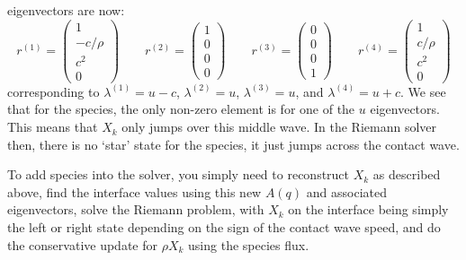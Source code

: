 eigenvectors are now:
\begin{equation}
r^{(1)} = \left ( \begin{array}{c} 1 \\ -c/\rho \\ c^2 \\ 0\end{array} \right )
%
\qquad
r^{(2)} = \left ( \begin{array}{c} 1 \\ 0 \\ 0  \\ 0\end{array} \right )
%
\qquad
r^{(3)} = \left ( \begin{array}{c} 0 \\ 0  \\ 0 \\ 1 \end{array} \right )
%
\qquad
r^{(4)} = \left ( \begin{array}{c} 1 \\ c/\rho \\ c^2 \\ 0 \end{array} \right )
\end{equation}
corresponding to $\lambda^{(1)} = u -c$, $\lambda^{(2)} = u$,
$\lambda^{(3)} = u$, and $\lambda^{(4)} = u + c$.  We see that for the
species, the only non-zero element is for one of the $u$ eigenvectors.
This means that $X_k$ only jumps over this middle wave.  In the
Riemann solver then, there is no `star' state for the species, it just
jumps across the contact wave.

To add species into the solver, you simply need to reconstruct $X_k$
as described above, find the interface values using this new $A(q)$
and associated eigenvectors, solve the Riemann problem, with $X_k$ on
the interface being simply the left or right state depending on the
sign of the contact wave speed, and do the conservative update for
$\rho X_k$ using the species flux.

